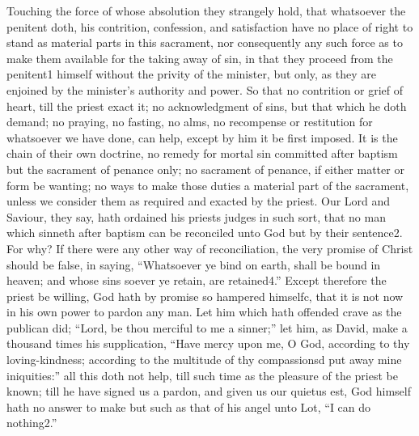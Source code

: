 Touching the force of whose absolution they strangely hold, that whatsoever the penitent doth, his contrition, confession, and satisfaction have no place of right to stand as material parts in this sacrament, nor consequently any such force as to make them available for the taking away of sin, in that they proceed from the penitent1 himself without the privity of the minister, but only, as they are enjoined by the minister’s authority and power. So that no contrition or grief of heart, till the priest exact it; no acknowledgment of sins, but that which he doth demand; no praying, no fasting, no alms, no recompense or restitution for whatsoever we have done, can help, except by him it be first imposed. It is the chain of their own doctrine, no remedy for mortal sin committed after baptism but the sacrament of penance only; no sacrament of penance, if either matter or form be wanting; no ways to make those duties a material part of the sacrament, unless we consider them as required and exacted by the priest. Our Lord and Saviour, they say, hath ordained his priests judges in such sort, that no man which sinneth after baptism can be reconciled unto God but by their sentence2. For why? If there were any other way of reconciliation, the very promise of Christ should be false, in saying, “Whatsoever ye bind on earth, shall be bound in heaven; and whose sins soever ye retain, are retained4.” Except therefore the priest be willing, God hath by promise so hampered himselfc, that it is not now in his own power to pardon any man. Let him which hath offended crave as the publican did; “Lord, be thou  merciful to me a sinner;” let him, as David, make a thousand times his supplication, “Have mercy upon me, O God, according to thy loving-kindness; according to the multitude of thy compassionsd put away mine iniquities:” all this doth not help, till such time as the pleasure of the priest be known; till he have signed us a pardon, and given us our quietus est, God himself hath no answer to make but such as that of his angel unto Lot, “I can do nothing2.”

